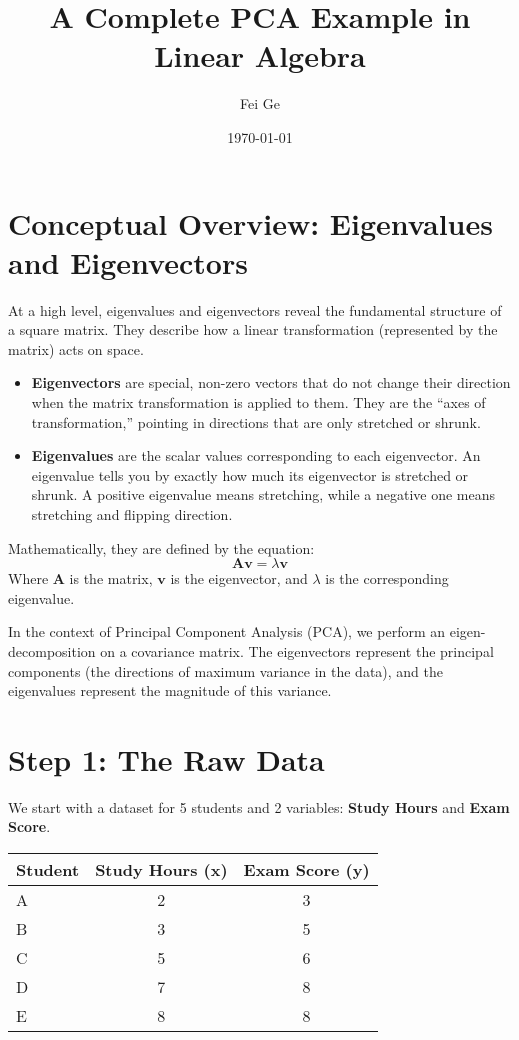 \documentclass{article}
\title{A Complete PCA Example in Linear Algebra}
\author{Fei Ge}
\date{\today}
\begin{document}
\maketitle

\section*{Conceptual Overview: Eigenvalues and Eigenvectors}

At a high level, eigenvalues and eigenvectors reveal the fundamental structure of a square matrix. They describe how a linear transformation (represented by the matrix) acts on space.

\begin{itemize}
    \item \textbf{Eigenvectors} are special, non-zero vectors that do not change their direction when the matrix transformation is applied to them. They are the ``axes of transformation,'' pointing in directions that are only stretched or shrunk.
    \item \textbf{Eigenvalues} are the scalar values corresponding to each eigenvector. An eigenvalue tells you by exactly how much its eigenvector is stretched or shrunk. A positive eigenvalue means stretching, while a negative one means stretching and flipping direction.
\end{itemize}

Mathematically, they are defined by the equation:
\[ \mathbf{Av} = \lambda\mathbf{v} \]
Where $\mathbf{A}$ is the matrix, $\mathbf{v}$ is the eigenvector, and $\lambda$ is the corresponding eigenvalue.

In the context of Principal Component Analysis (PCA), we perform an eigen-decomposition on a covariance matrix. The eigenvectors represent the principal components (the directions of maximum variance in the data), and the eigenvalues represent the magnitude of this variance.

\hrulefill


\section{Step 1: The Raw Data}

We start with a dataset for 5 students and 2 variables: \textbf{Study Hours} and \textbf{Exam Score}.

\begin{table}[h!]
\centering
\begin{tabular}{lcc}
\toprule
\textbf{Student} & \textbf{Study Hours (x)} & \textbf{Exam Score (y)} \\
\midrule
A & 2 & 3 \\
B & 3 & 5 \\
C & 5 & 6 \\
D & 7 & 8 \\
E & 8 & 8 \\
\bottomrule
\end{tabular}
\end{table}
\end{document}
